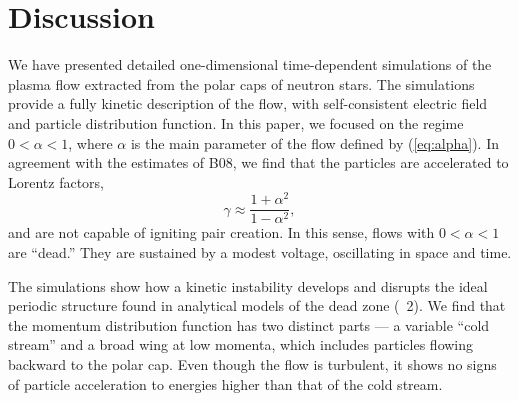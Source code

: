 


\section{Discussion}


We have presented detailed one-dimensional time-dependent simulations
of the plasma flow extracted from the polar caps of neutron stars.
The simulations provide a fully kinetic description of the flow,
with self-consistent electric field and particle distribution function.
In this paper, we focused on the regime $0<\alpha<1$, where $\alpha$ is the main
parameter of the flow defined by \Eq(\ref{eq:alpha}).
In agreement with the estimates of B08, we find that
the particles are accelerated to Lorentz factors,
\begin{equation}
\label{eq:gam2}
   \gamma\approx \frac{1+\alpha^2}{1-\alpha^2},
 \end{equation}
and are not capable of igniting pair creation.
In this sense, flows with $0<\alpha<1$ are ``dead.''
They are sustained by a modest voltage, oscillating in space and time.

The simulations show how a kinetic instability develops and disrupts the ideal
periodic structure found in analytical models of the dead zone (\Sect~2).
We find that the momentum distribution function has two distinct parts --- a
variable ``cold stream'' and a broad wing at low momenta, which includes particles
flowing backward to the polar cap. Even though the flow is turbulent, it shows
no signs of particle acceleration to energies higher than that of the cold stream.



